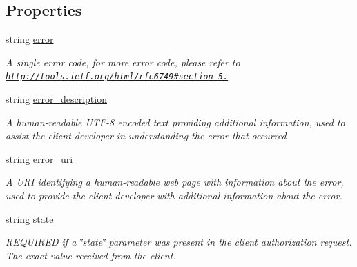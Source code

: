 \subsection*{Properties}
\begin{DoxyCompactItemize}
\item 
string \hyperlink{class_accela_1_1_windows_store_s_d_k_1_1_accela_o_auth_error_result_a82fb3e58c6e93a8a68acf5e71817a857}{error}
\begin{DoxyCompactList}\small\item\em A single error code, for more error code, please refer to \href{http://tools.ietf.org/html/rfc6749#section-5.2}{\tt http\+://tools.\+ietf.\+org/html/rfc6749\#section-\/5.} \end{DoxyCompactList}\item 
string \hyperlink{class_accela_1_1_windows_store_s_d_k_1_1_accela_o_auth_error_result_a2e67c37c028389e1bb95c1ad550e544f}{error\+\_\+description}
\begin{DoxyCompactList}\small\item\em A human-\/readable U\+T\+F-\/8 encoded text providing additional information, used to assist the client developer in understanding the error that occurred \end{DoxyCompactList}\item 
string \hyperlink{class_accela_1_1_windows_store_s_d_k_1_1_accela_o_auth_error_result_ac80f86c37341859521bc4ffd57cadb12}{error\+\_\+uri}
\begin{DoxyCompactList}\small\item\em A U\+R\+I identifying a human-\/readable web page with information about the error, used to provide the client developer with additional information about the error. \end{DoxyCompactList}\item 
string \hyperlink{class_accela_1_1_windows_store_s_d_k_1_1_accela_o_auth_error_result_ace9b1b641ff06f7ece69a0af8309134c}{state}
\begin{DoxyCompactList}\small\item\em R\+E\+Q\+U\+I\+R\+E\+D if a \char`\"{}state\char`\"{} parameter was present in the client authorization request. The exact value received from the client. \end{DoxyCompactList}\end{DoxyCompactItemize}


